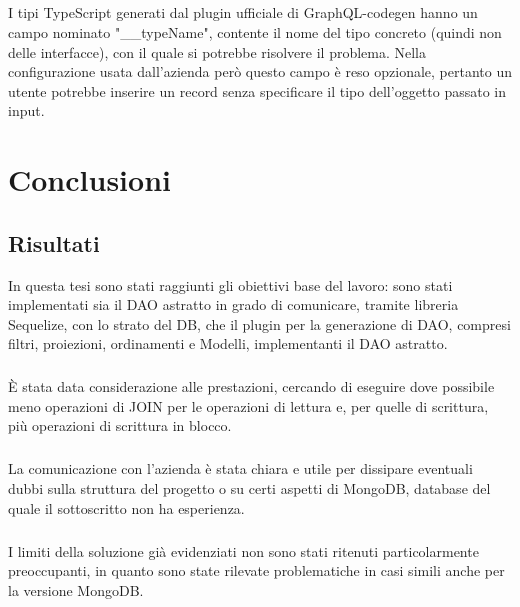 \documentclass[a4paper, 12pt]{report}
\begin{document}
        \paragraph*{}
        I tipi TypeScript generati dal plugin ufficiale di GraphQL-codegen hanno un campo nominato "__typeName", contente il nome del tipo concreto (quindi non delle interfacce), con il quale si potrebbe risolvere il problema.
        Nella configurazione usata dall'azienda però questo campo è reso opzionale, pertanto un utente potrebbe inserire un record senza specificare il tipo dell'oggetto passato in input.
    \newpage
    \chapter{Conclusioni}
      \section*{Risultati}
      In questa tesi sono stati raggiunti gli obiettivi base del lavoro: sono stati implementati sia il DAO astratto in grado di comunicare, tramite libreria Sequelize, con lo strato del DB, che il plugin per la generazione di DAO, compresi filtri, proiezioni, ordinamenti e Modelli, implementanti il DAO astratto.
      \paragraph*{}
        È stata data considerazione alle prestazioni, cercando di eseguire dove possibile meno operazioni di JOIN per le operazioni di lettura e, per quelle di scrittura, più operazioni di scrittura in blocco.
      \paragraph*{}
        La comunicazione con l'azienda è stata chiara e utile per dissipare eventuali dubbi sulla struttura del progetto o su certi aspetti di MongoDB, database del quale il sottoscritto non ha esperienza.
      \paragraph*{}
        I limiti della soluzione già evidenziati non sono stati ritenuti particolarmente preoccupanti, in quanto sono state rilevate problematiche in casi simili anche per la versione MongoDB.
\end{document}
